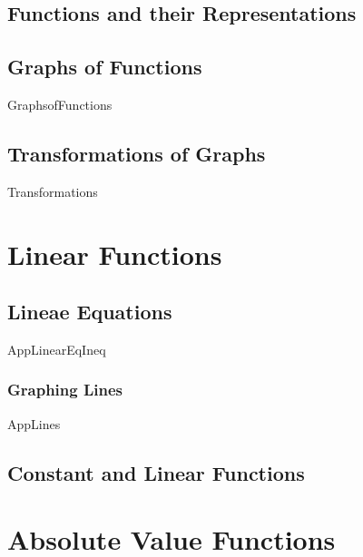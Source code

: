 \section{Functions and their Representations}



\newpage

\section{Graphs of Functions}

{GraphsofFunctions}

\newpage

\section{Transformations of Graphs}

{Transformations}

\newpage

\chapter{Linear Functions}

\section{Lineae Equations}

{AppLinearEqIneq}
\newpage

\subsection{Graphing Lines}
{AppLines}

\newpage

\section{Constant and Linear Functions}



\newpage


\chapter{Absolute Value Functions}

